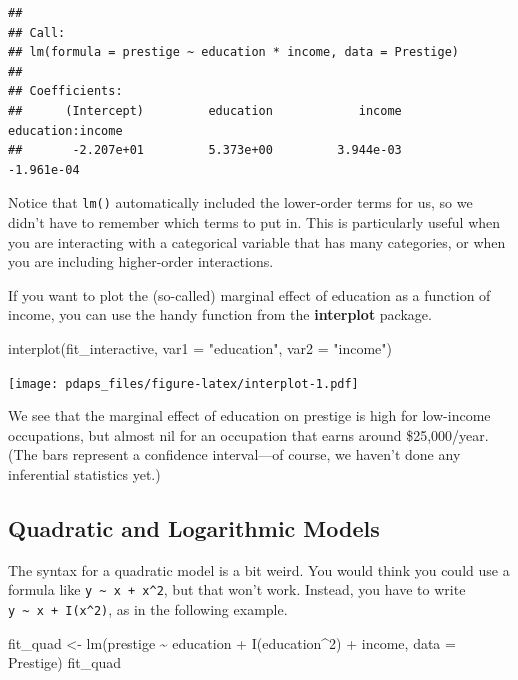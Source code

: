 \documentclass[
  12pt,
  oneside,openany]{book}
\newenvironment{Shaded}{\begin{snugshade}}{\end{snugshade}}
\newcommand{\AttributeTok}[1]{\textcolor[rgb]{0.77,0.63,0.00}{#1}}
\newcommand{\DecValTok}[1]{\textcolor[rgb]{0.00,0.00,0.81}{#1}}
\newcommand{\FunctionTok}[1]{\textcolor[rgb]{0.00,0.00,0.00}{#1}}
\newcommand{\NormalTok}[1]{#1}
\newcommand{\OtherTok}[1]{\textcolor[rgb]{0.56,0.35,0.01}{#1}}
\newcommand{\SpecialCharTok}[1]{\textcolor[rgb]{0.00,0.00,0.00}{#1}}
\newcommand{\StringTok}[1]{\textcolor[rgb]{0.31,0.60,0.02}{#1}}
\begin{document}
\begin{verbatim}
## 
## Call:
## lm(formula = prestige ~ education * income, data = Prestige)
## 
## Coefficients:
##      (Intercept)         education            income  education:income  
##       -2.207e+01         5.373e+00         3.944e-03        -1.961e-04
\end{verbatim}

Notice that \texttt{lm()} automatically included the lower-order terms for us, so we didn't have to remember which terms to put in. This is particularly useful when you are interacting with a categorical variable that has many categories, or when you are including higher-order interactions.

If you want to plot the (so-called) marginal effect of education as a function of income, you can use the handy function from the \textbf{interplot} package.

\begin{Shaded}
\begin{Highlighting}[]
\FunctionTok{interplot}\NormalTok{(fit\_interactive, }\AttributeTok{var1 =} \StringTok{"education"}\NormalTok{, }\AttributeTok{var2 =} \StringTok{"income"}\NormalTok{)}
\end{Highlighting}
\end{Shaded}

\texttt{[image: pdaps\_files/figure-latex/interplot-1.pdf]}

We see that the marginal effect of education on prestige is high for low-income occupations, but almost nil for an occupation that earns around \$25,000/year. (The bars represent a confidence interval---of course, we haven't done any inferential statistics yet.)

\hypertarget{quadratic-and-logarithmic-models}{%
\subsection{Quadratic and Logarithmic Models}\label{quadratic-and-logarithmic-models}}

The syntax for a quadratic model is a bit weird. You would think you could use a formula like \texttt{y\ \textasciitilde{}\ x\ +\ x\^{}2}, but that won't work. Instead, you have to write \texttt{y\ \textasciitilde{}\ x\ +\ I(x\^{}2)}, as in the following example.

\begin{Shaded}
\begin{Highlighting}[]
\NormalTok{fit\_quad }\OtherTok{\textless{}{-}} \FunctionTok{lm}\NormalTok{(prestige }\SpecialCharTok{\textasciitilde{}}\NormalTok{ education }\SpecialCharTok{+} \FunctionTok{I}\NormalTok{(education}\SpecialCharTok{\^{}}\DecValTok{2}\NormalTok{) }\SpecialCharTok{+}\NormalTok{ income, }\AttributeTok{data =}\NormalTok{ Prestige)}
\NormalTok{fit\_quad}
\end{Highlighting}
\end{Shaded}
\end{document}
